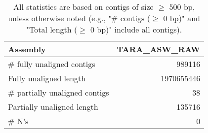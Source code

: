 \documentclass[12pt,a4paper]{article}
\begin{document}
\begin{table}[ht]
\begin{center}
\caption{All statistics are based on contigs of size $\geq$ 500 bp, unless otherwise noted (e.g., "\# contigs ($\geq$ 0 bp)" and "Total length ($\geq$ 0 bp)" include all contigs).}
\begin{tabular}{|l*{1}{|r}|}
\hline
Assembly & TARA\_ASW\_RAW \\ \hline
\# fully unaligned contigs & 989116 \\ \hline
Fully unaligned length & 1970655446 \\ \hline
\# partially unaligned contigs & 38 \\ \hline
Partially unaligned length & 135716 \\ \hline
\# N's & 0 \\ \hline
\end{tabular}
\end{center}
\end{table}
\end{document}

